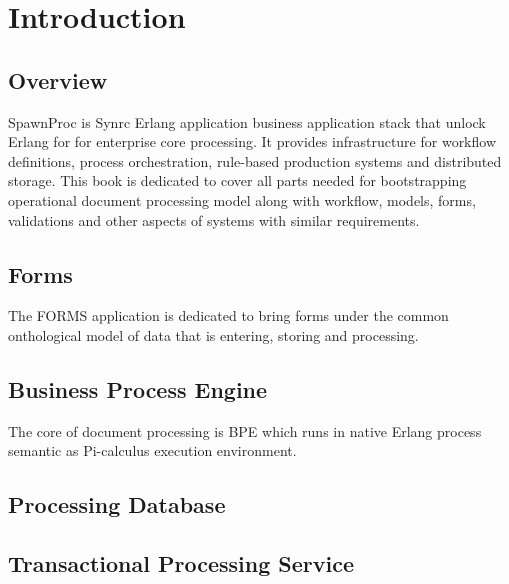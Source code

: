 \section{Introduction}

\subsection{Overview}
SpawnProc is Synrc Erlang application business application stack that
unlock Erlang for for enterprise core processing.
It provides infrastructure for workflow definitions, process orchestration,
rule-based production systems and distributed storage. This book is dedicated to cover
all parts needed for bootstrapping operational document processing model along with
workflow, models, forms, validations and other aspects of systems with similar requirements.

\subsection{Forms}
The FORMS application is dedicated to bring forms under the common
onthological model of data that is entering, storing and processing.

\subsection{Business Process Engine}
The core of document processing is BPE which runs in native Erlang process semantic
as Pi-calculus execution environment.

\subsection{Processing Database}

\subsection{Transactional Processing Service}
